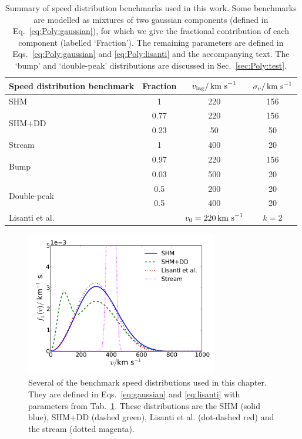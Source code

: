 \begin{table}[t]
  \setlength{\extrarowheight}{2pt}
  \setlength{\tabcolsep}{3pt}
  \begin{center}
	\begin{tabular}{m{3cm}|ccc}
        \hline \hline
	Speed distribution benchmark & Fraction & $v_\textrm{lag} / \,\textrm{km s}^{-1}$ & $\sigma_v / \,\textrm{km s}^{-1}$ \\
        \hline
	SHM & 1 & 220 & 156 \\
	\hline
	\multirow{2}{*}{SHM+DD} & 0.77 & 220 & 156 \\
	& 0.23 & 50 & 50 \\
	\hline
	Stream & 1 & 400 & 20 \\
	\hline
	\multirow{2}{*}{Bump} & 0.97 & 220 & 156 \\
	& 0.03 & 500 & 20 \\
	\hline
	\multirow{2}{*}{Double-peak} & 0.5 & 200 & 20 \\
	& 0.5 & 400 & 20 \\
	\hline
	Lisanti et al. & & $v_0 = 220 \,\textrm{km s}^{-1}$ & $k = 2$ \\
        \hline \hline
	\end{tabular}
        
  \end{center}
\caption[Summary of speed distribution benchmarks used in Chapter \ref{ch:Poly}]{Summary of speed distribution benchmarks used in this work. Some benchmarks are modelled as mixtures of two gaussian components (defined in Eq.~\ref{eq:Poly:gaussian}), for which we give the fractional contribution of each component (labelled `Fraction'). The remaining parameters are defined in Eqs.~\ref{eq:Poly:gaussian} and \ref{eq:Poly:lisanti} and the accompanying text. The `bump' and `double-peak' distributions are discussed in Sec.~\ref{sec:Poly:test}.}
\label{tab:Poly:distributions}
\end{table}

\begin{figure}[t]
\centering
  \includegraphics[width=0.75\textwidth]{Poly/SpeedDistributions-Ensemble.pdf}
  \caption[Several benchmark speed distributions used to test the polynomial $\ln f(v)$ method.]{Several of the benchmark speed distributions used in this chapter. They are defined in Eqs.~\ref{eq:gaussian} and \ref{eq:lisanti} with parameters from Tab.~\ref{tab:Poly:distributions}. These distributions are the SHM (solid blue), SHM+DD (dashed green), Lisanti et al. (dot-dashed red) and the stream (dotted magenta).}
  \label{fig:Poly:Ensemble_distributions}
\end{figure}

